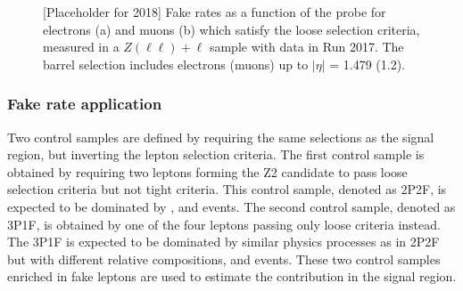 \begin{figure}[!htb]
\begin{center}
    \caption{
        [Placeholder for 2018] Fake rates as a function of the probe \pt for  electrons (a) and muons (b) which satisfy the loose selection criteria, measured in
        a $Z(\ell\ell)+\ell$ sample with data in Run 2017.
        The barrel selection includes electrons (muons) up to $|\eta|$ = 1.479 (1.2).
    }
\label{fig:os_fakerates_18}
\end{center}
\end{figure}

\subsubsection{Fake rate application}
Two control samples are defined by requiring the same selections as the signal region, but inverting the 
lepton selection criteria. The first control sample is obtained by requiring two leptons forming the Z2 
candidate to pass loose selection criteria but not tight criteria. This control sample, denoted as 2P2F, 
is expected to be dominated by \dy, \ttNew and \zg events. The second control sample, denoted as 3P1F, is 
obtained by one of the four leptons passing only loose criteria instead. The 3P1F is expected to be dominated 
by similar physics processes as in 2P2F but with different relative compositions, and \wz events.
These two control samples enriched in fake leptons are used to estimate the \zx contribution in the signal 
region.

